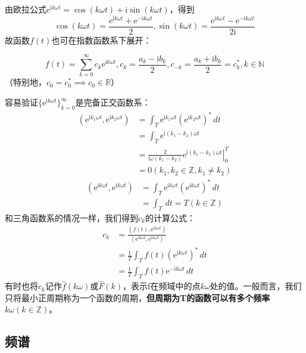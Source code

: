 \documentclass{ctexbook}
\newcommand{\evalat}[3]{\left.#1\right|_{#2}^{#3}}
\begin{document}
由欧拉公式$\mathrm{e}^{\mathrm{i}k\omega t}=\cos(k\omega t)+\mathrm{i}\sin(k\omega t)$，得到
\[\cos(k\omega t)=\frac{\mathrm{e}^{\mathrm{i}k\omega t}+\mathrm{e}^{-\mathrm{i}k\omega t}}{2},\sin(k\omega t)=\frac{\mathrm{e}^{\mathrm{i}k\omega t}-\mathrm{e}^{-\mathrm{i}k\omega t}}{2\mathrm{i}}\]
故函数$f(t)$也可在指数函数系下展开：\begin{definition}[指数形式傅里叶展开]
    \[f(t)=\sum_{k = 0}^{\infty}  c_k \mathrm{e}^{\mathrm{i}k\omega t} ,c_k=\frac{a_k-\mathrm{i}b_k}{2},c_{-k}=\frac{a_k+\mathrm{i}b_k}{2}=c_k^*,k\in \mathbb{N}\]
（特别地，$c_0=c_0^*\implies c_0\in\mathbb{R} $）
\end{definition}
容易验证$\{\mathrm{e}^{\mathrm{i}k\omega t}\}_{k=0}^{\infty}$是完备正交函数系：
\begin{align*}
    (\mathrm{e}^{\mathrm{i}k_1\omega t},\mathrm{e}^{\mathrm{i}k_2\omega t})&=\int_{T}\mathrm{e}^{\mathrm{i}k_1\omega t}(\mathrm{e}^{\mathrm{i}k_2\omega t})^*\,dt\\
    &=\int_{T}\mathrm{e}^{\mathrm{i}(k_1-k_2)\omega t}\\
    &=\frac{2}{\mathrm{i}\omega (k_1-k_2)}\evalat{\mathrm{e}^{\mathrm{i}(k_1-k_2)\omega t}}{0}{T}\\
    &=0(k_1,k_2\in \mathbb{Z},k_1\neq k_2)
\end{align*}
\begin{align*}
    (\mathrm{e}^{\mathrm{i}k\omega t},\mathrm{e}^{\mathrm{i}k\omega t})&=\int_{T}\mathrm{e}^{\mathrm{i}k\omega t}(\mathrm{e}^{\mathrm{i}k\omega t})^*\,dt\\
    &=\int_{T}\,dt=T(k\in \mathbb{Z} )
\end{align*}
和三角函数系的情况一样，我们得到$c_k$的计算公式：
\begin{align*}
    c_k & =\frac{(f(t),\mathrm{e}^{\mathrm{i}k\omega t})}{(\mathrm{e}^{\mathrm{i}k\omega t},\mathrm{e}^{\mathrm{i}k\omega t})} \\
        & =\frac{1}{T}\int_{T}f(t)(\mathrm{e}^{\mathrm{i}k\omega t})^*\,dt                 \\
        & =\frac{1}{T}\int_{T}f(t)\mathrm{e}^{-\mathrm{i}k\omega t}\,dt
\end{align*}
有时也将$c_k$记作$\hat{f}(k\omega)$或$\hat{F}(k)$，表示f在频域中的点$k\omega$处的值。一般而言，我们只将最小正周期称为一个函数的周期，\textbf{但周期为T的函数可以有多个频率$k\omega(k \in \mathbb{Z})$}。

\subsection{频谱}\label{sub:spectrum}
\end{document}
